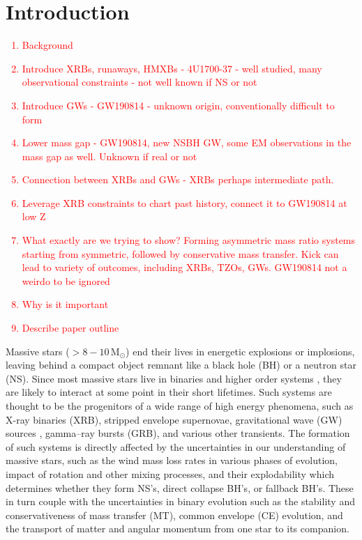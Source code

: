 \documentclass[linenumbers,trackchanges,twocolumn]{aastex701}
\newcommand{\Mdot}{\mathrm{M}_{\odot}}
\newcommand{\red}{\textcolor{red}}
\begin{document}
\section{Introduction}
\red{
\begin{enumerate}
    \item Background
    \item Introduce XRBs, runaways, HMXBs - 4U1700-37 - well studied, many observational constraints - not well known if NS or not
    \item Introduce GWs  - GW190814 - unknown origin, conventionally difficult to form
    \item Lower mass gap - GW190814, new NSBH GW, some EM observations in the mass gap as well. Unknown if real or not
    \item Connection between XRBs and GWs - XRBs perhaps intermediate path.
    \item Leverage XRB constraints to chart past history, connect it to GW190814 at low Z
    \item What exactly are we trying to show? Forming asymmetric mass ratio systems starting from symmetric, followed by conservative mass transfer. Kick can lead to variety of outcomes, including XRBs, TZOs, GWs. GW190814 not a weirdo to be ignored
    \item Why is it important
    \item Describe paper outline
\end{enumerate}
}

Massive stars ($> 8-10\,\Mdot$) end their lives in energetic explosions or implosions, leaving behind a compact object remnant like a black hole (BH) or a neutron star (NS). Since most massive stars live in binaries and higher order systems \cite{2012Sci...337..444S,2023ASPC..534..275O}, they are likely to interact at some point in their short lifetimes. Such systems are thought to be the progenitors of a wide range of high energy phenomena, such as X-ray binaries (XRB), stripped envelope supernovae, gravitational wave (GW) sources \cite{2023PhRvX..13d1039A}, gamma--ray bursts (GRB), and various other transients. The formation of such systems is directly affected by the uncertainties in our understanding of massive stars, such as the wind mass loss rates in various phases of evolution, impact of rotation and other mixing processes, and their explodability which determines whether they form NS's, direct collapse BH's, or fallback BH's. These in turn couple with the uncertainties in binary evolution such as the stability and conservativeness of mass transfer (MT), common envelope (CE) evolution, and the transport of matter and angular momentum from one star to its companion. 
\end{document}
